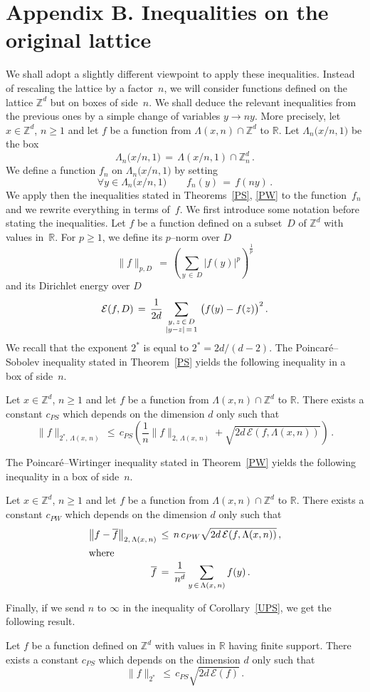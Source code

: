 \documentclass[AHL, Unicode, longabstracts, published]{cedram}
\newcommand{\tatop}[2]{\genfrac{}{}{0pt}{1}{#1}{#2}}
\newcommand*\Zd {{\mathbb Z^d}}
\newcommand*\Znd {{\mathbb Z_n^d}}
\newcommand*\R{\mathbb{R}}
\newcommand*\baf {{\overline f}}
\newcommand*\La {{\Lambda}}
\newcommand{\cE}{\mathcal{E}}
\let\oldforall\forall
\renewcommand*{\forall}{\mathrel{\oldforall}}
\begin{document}
\section*{Appendix B. Inequalities on the original lattice}
We shall adopt a slightly different viewpoint to apply these inequalities. Instead of rescaling the lattice by a factor~$n$, we will consider functions defined on the lattice $\Zd$ but on boxes of side~$n$. We shall deduce the relevant inequalities from the previous ones by a simple change of variables $y\to ny$. More precisely, let $x\in\Zd$, $n\geq 1$ and let $f$ be a function from $\La(x,n)\cap\Zd$ to $\R$. Let $\La_n\big({x}/{n},1\big)$ be the box
\[
\La_n\big({x}/{n},1\big)\,=\,\La(x/n,1)\cap\Znd\,.
\]
We define a function $f_n$ on $\La_n\big({x}/{n},1\big)$ by setting
\[
\forall y
\in\La_n\big({x}/{n},1\big)
\qquad f_n(y)\,=\,f(ny)\,.
\]
We apply then the inequalities stated in Theorems~\ref{PS}, \ref{PW} to the function~$f_n$ and we rewrite everything in terms of~$f$. We first introduce some notation before stating the inequalities. Let $f$ be a function defined on a subset~$D$ of $\Zd$ with values in~$\R$. For $p\geq 1$, we define its $p$--norm over $D$
\[
\|f\|_{p,D}\,=\,
\left(\sum_{y\,\in\,D} |f(y)|^p\right)^{\frac{1}{p}}
\]
and its Dirichlet energy over $D$
\[
\cE(f,D)\,=\,
\frac{1}{2d}
\sum_{\tatop{y,\,z\,\in\,D}{|y-z|\,=\,1}}
\big(f(y)-f(z)\big)^2\,.
\]
We recall that the exponent $2^*$ is equal to $2^*=2d/(d-2)$. The Poincaré--Sobolev inequality stated in Theorem~\ref{PS} yields the following inequality in a box of side~$n$.
\begin{coro}\label{UPS}
Let $x\in\Zd$, $n\geq 1$ and let $f$ be a function from $\La(x,n)\cap\Zd$ to $\R$. There exists a constant $c_{PS}$ which depends on the dimension $d$ only such that
\[
\|f\|_{2^*,\,\La(x,\,n)}
\,\leq\,c_{PS}\left(\frac{1}{n}
\|f\|_{2,\,\La(x,\,n)}+\sqrt{2d\,\cE(f,\La(x,n))}\right)\,.
\]
\end{coro}

The Poincaré--Wirtinger inequality stated in Theorem~\ref{PW} yields the following inequality in a box of side~$n$.
\begin{coro}\label{UPW}
Let $x\in\Zd$, $n\geq 1$ and let $f$ be a function from $\La(x,n)\cap\Zd$ to $\R$. There exists a constant $c_{PW}$ which depends on the dimension $d$ only such that
\begin{align*}
\left\|f-\baf\right\|_{2,\,\La(x,\,n)}
\,&\leq\,n\,c_{PW}
\sqrt{2d\,\cE(f,\La(x,n))}\,,\\
\intertext{where}
\baf\,&=\,
\frac{1}{n^d}
\sum_{y\,\in\,\Lambda(x,\,n)}
f(y)\,.
\end{align*}
\end{coro}

Finally, if we send $n$ to $\infty$ in the inequality of Corollary~\ref{UPS}, we get the following result.
\begin{coro}\label{TPS}
Let $f$ be a function defined on $\Zd$ with values in $\R$ having finite support. There exists a constant $c_{PS}$ which depends on the dimension $d$ only such that
\[
\|f\|_{2^*}
\,\leq\,c_{PS}
\sqrt{2d\,\cE(f)}\,.
\]
\end{coro}



\end{document}
